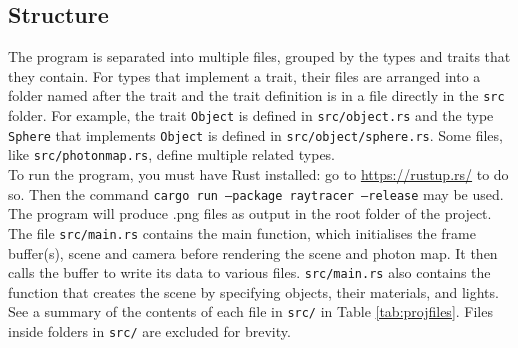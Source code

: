 \documentclass[a4paper]{article}
\begin{document}
\subsection{Structure}
The program is separated into multiple files, grouped by the types and traits that they contain. For types that implement a trait, their files are arranged into a folder named after the trait and the trait definition is in a file directly in the \texttt{src} folder. For example, the trait \texttt{Object} is defined in \texttt{src/object.rs} and the type \texttt{Sphere} that implements \texttt{Object} is defined in \texttt{src/object/sphere.rs}. Some files, like \texttt{src/photonmap.rs}, define multiple related types.\\

To run the program, you must have Rust installed: go to \url{https://rustup.rs/} to do so. Then the command \texttt{cargo run --package raytracer --release} may be used. The program will produce .png files as output in the root folder of the project.\\

The file \texttt{src/main.rs} contains the main function, which initialises the frame buffer(s), scene and camera before rendering the scene and photon map. It then calls the buffer to write its data to various files. \texttt{src/main.rs} also contains the function that creates the scene by specifying objects, their materials, and lights. See a summary of the contents of each file in \texttt{src/} in Table \ref{tab:projfiles}. Files inside folders in \texttt{src/} are excluded for brevity.\\
\end{document}
